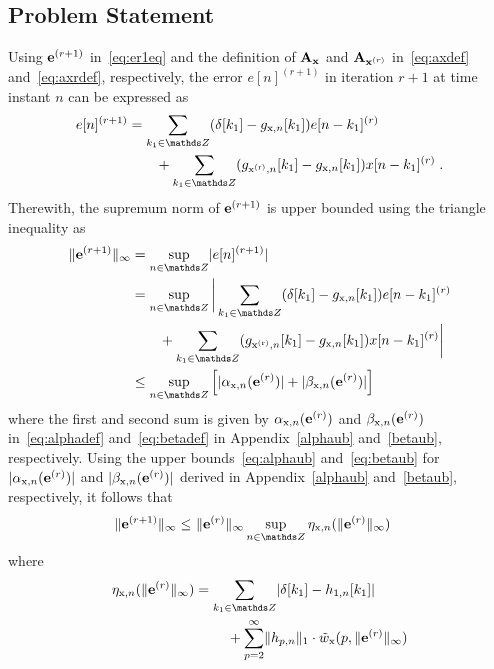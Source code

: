 \documentclass[10pt,twocolumn,twoside]{IEEEtran}
\begin{document}
\subsection{Problem Statement}

Using $\bm{\mathrm{e}}^{(r+1)}$ in~\eqref{eq:er1eq} and the definition of
$\bm{\mathrm{A}}_{\bm{\mathrm{x}}}$ and $\bm{\mathrm{A}}_{\bm{\mathrm{x}}^{(r)}}$ in~\eqref{eq:axdef}
and~\eqref{eq:axrdef}, respectively, the error
$e[n]^{(r+1)}$ in iteration $r+1$ at time instant $n$ can be expressed as
\begin{align*}
	e[n]^{(r+1)}
		&= \sum_{k_1\in\Z} (\delta[k_1]-\sg{x}{n}[k_1]) e[n-k_1]^{(r)} \\
				&\qquad + \sum_{k_1\in\Z} (\sg{x^{(r)}}{n}[k_1] - \sg{x}{n}[k_1]) x[n-k_1]^{(r)}\;.
\end{align*}
Therewith, the supremum norm of $\bm{\mathrm{e}}^{(r+1)}$ is upper bounded using
the triangle inequality as
\begin{align*}
	\norminf{\vm{e}^{(r+1)}}
		&= \sup_{n\in\Z} \abs{e[n]^{(r+1)}} \\
		&= \sup_{n\in\Z} \bigg| \sum_{k_1\in\Z} (\delta[k_1]-\sg{x}{n}[k_1]) e[n-k_1]^{(r)} \\
				&\qquad + \sum_{k_1\in\Z} (\sg{x^{(r)}}{n}[k_1] - \sg{x}{n}[k_1]) x[n-k_1]^{(r)} \bigg| \\
		&\leq \sup_{n\in\Z} \left[
			\abs{\salpha{x}{n}(\vm{e}^{(r)})} + \abs{\sbeta{x}{n}(\vm{e}^{(r)})} \right]
\end{align*}
where the first and second sum is given by
$\alpha_{\mathrm{x},n}(\bm{\mathrm{e}}^{(r)})$ and $\beta_{\mathrm{x},n}(\bm{\mathrm{e}}^{(r)})$
in~\eqref{eq:alphadef} and~\eqref{eq:betadef} in
Appendix~\ref{alphaub} and~\ref{betaub}, respectively. Using the upper bounds~\eqref{eq:alphaub}
and~\eqref{eq:betaub} for $\lvert\alpha_{\mathrm{x},n}(\bm{\mathrm{e}}^{(r)})\rvert$ and $\lvert\beta_{\mathrm{x},n}(\bm{\mathrm{e}}^{(r)})\rvert$
derived in Appendix~\ref{alphaub} and~\ref{betaub}, respectively, it follows that
\begin{align}
	\norminf{\vm{e}^{(r+1)}}
    \leq&\ \norminf{\vm{e}^{(r)}} \sup_{n\in\Z} \seta{x}{n}(\norminf{\vm{e}^{(r)}})
	\label{eq:er1leqereta}
\end{align}
where
\begin{align}
	\begin{split}
		\seta{x}{n}(\norminf{\vm{e}^{(r)}}) &= \sum_{k_1\in\Z} \abs{\delta[k_1]-h_{1,n}[k_1]} \\
					&\qquad\ + \sum_{p=2}^\infty \normone{h_{p,n}} \cdot \swtilde{x}(p,\norminf{\vm{e}^{(r)}})
	\end{split}
	\label{eq:etardef}
\end{align}
\end{document}

